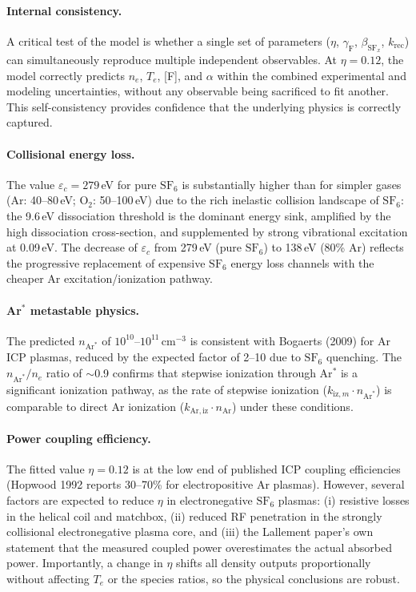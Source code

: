 \documentclass[11pt,a4paper]{article}
\newcommand{\SFx}{\mathrm{SF}_x}
\newcommand{\SFsix}{\mathrm{SF}_6}
\newcommand{\Ar}{\mathrm{Ar}}
\newcommand{\Te}{T_e}
\newcommand{\ne}{n_e}
\begin{document}
\paragraph{Internal consistency.}  A critical test of the model is whether a single set of parameters ($\eta$, $\gamma_\mathrm{F}$, $\beta_{\SFx}$, $k_\mathrm{rec}$) can simultaneously reproduce multiple independent observables.  At $\eta = 0.12$, the model correctly predicts $\ne$, $\Te$, [F], and $\alpha$ within the combined experimental and modeling uncertainties, without any observable being sacrificed to fit another.  This self-consistency provides confidence that the underlying physics is correctly captured.

\paragraph{Collisional energy loss.}  The value $\varepsilon_c = 279$\,eV for pure $\SFsix$ is substantially higher than for simpler gases (Ar: 40--80\,eV; O$_2$: 50--100\,eV) due to the rich inelastic collision landscape of $\SFsix$: the 9.6\,eV dissociation threshold is the dominant energy sink, amplified by the high dissociation cross-section, and supplemented by strong vibrational excitation at 0.09\,eV.  The decrease of $\varepsilon_c$ from 279\,eV (pure $\SFsix$) to 138\,eV (80\% Ar) reflects the progressive replacement of expensive $\SFsix$ energy loss channels with the cheaper Ar excitation/ionization pathway.

\paragraph{Ar$^*$ metastable physics.}  The predicted $n_{\Ar^*}$ of $10^{10}$--$10^{11}$\,cm$^{-3}$ is consistent with Bogaerts (2009) for Ar ICP plasmas, reduced by the expected factor of 2--10 due to $\SFsix$ quenching.  The $n_{\Ar^*}/\ne$ ratio of $\sim$0.9 confirms that stepwise ionization through Ar$^*$ is a significant ionization pathway, as the rate of stepwise ionization ($k_{\mathrm{iz},m} \cdot n_{\Ar^*}$) is comparable to direct Ar ionization ($k_{\Ar,\mathrm{iz}} \cdot n_\Ar$) under these conditions.

\paragraph{Power coupling efficiency.}  The fitted value $\eta = 0.12$ is at the low end of published ICP coupling efficiencies (Hopwood 1992 reports 30--70\% for electropositive Ar plasmas).  However, several factors are expected to reduce $\eta$ in electronegative $\SFsix$ plasmas: (i) resistive losses in the helical coil and matchbox, (ii) reduced RF penetration in the strongly collisional electronegative plasma core, and (iii) the Lallement paper's own statement that the measured coupled power overestimates the actual absorbed power.  Importantly, a change in $\eta$ shifts all density outputs proportionally without affecting $\Te$ or the species ratios, so the physical conclusions are robust.
\end{document}
